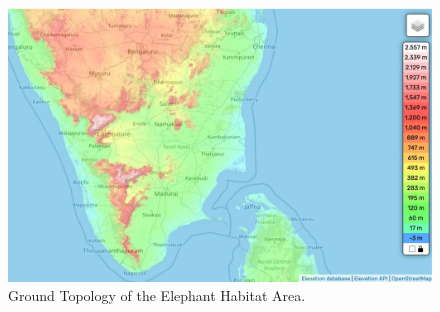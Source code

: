 \begin{figure}
    \centering
    \includegraphics[width=0.9\columnwidth]{figures/GroundTopology.pdf}
    \caption{Ground Topology of the Elephant Habitat Area.}
    \label{fig:groundtopology}
\end{figure}